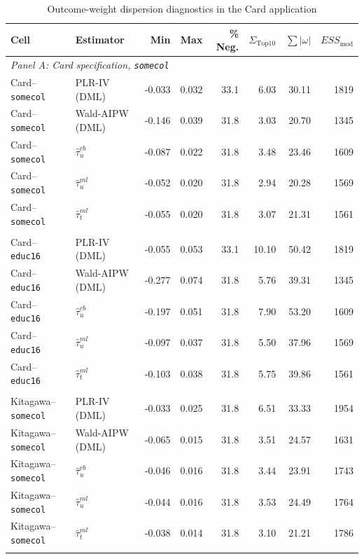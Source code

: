 \documentclass[12pt, a4paper, oneside]{article}
\theoremstyle{plain}
\theoremstyle{definition}
\begin{document}
\begin{table}[htbp]
\centering
\caption{Outcome-weight dispersion diagnostics in the Card application}
\label{tab:card_owd}
\scriptsize
\setlength{\tabcolsep}{3.5pt}
\begin{tabular}{llrrrrrr}
\toprule
Cell & Estimator & Min & Max & \% Neg. & $\Sigma_{\mathrm{Top10}}$ & $\sum|\omega|$ & $ESS_{\mathrm{mod}}$ \\
\midrule
\multicolumn{8}{l}{\textit{Panel A: Card specification, \texttt{somecol}}} \\
Card--\texttt{somecol} & PLR-IV (DML) & -0.033 & 0.032 & 33.1 & 6.03 & 30.11 & 1819 \\
Card--\texttt{somecol} & Wald-AIPW (DML) & -0.146 & 0.039 & 31.8 & 3.03 & 20.70 & 1345 \\
Card--\texttt{somecol} & $\hat{\tau}^{cb}_{u}$ & -0.087 & 0.022 & 31.8 & 3.48 & 23.46 & 1609 \\
Card--\texttt{somecol} & $\hat{\tau}^{ml}_{u}$ & -0.052 & 0.020 & 31.8 & 2.94 & 20.28 & 1569 \\
Card--\texttt{somecol} & $\hat{\tau}^{ml}_{t}$ & -0.055 & 0.020 & 31.8 & 3.07 & 21.31 & 1561 \\
\addlinespace

\multicolumn{8}{l}{\textit{Panel B: Card specification, \texttt{educ16}}} \\
Card--\texttt{educ16} & PLR-IV (DML) & -0.055 & 0.053 & 33.1 & 10.10 & 50.42 & 1819 \\
Card--\texttt{educ16} & Wald-AIPW (DML) & -0.277 & 0.074 & 31.8 & 5.76 & 39.31 & 1345 \\
Card--\texttt{educ16} & $\hat{\tau}^{cb}_{u}$ & -0.197 & 0.051 & 31.8 & 7.90 & 53.20 & 1609 \\
Card--\texttt{educ16} & $\hat{\tau}^{ml}_{u}$ & -0.097 & 0.037 & 31.8 & 5.50 & 37.96 & 1569 \\
Card--\texttt{educ16} & $\hat{\tau}^{ml}_{t}$ & -0.103 & 0.038 & 31.8 & 5.75 & 39.86 & 1561 \\
\addlinespace

\multicolumn{8}{l}{\textit{Panel C: Kitagawa specification, \texttt{somecol}}} \\
Kitagawa--\texttt{somecol} & PLR-IV (DML) & -0.033 & 0.025 & 31.8 & 6.51 & 33.33 & 1954 \\
Kitagawa--\texttt{somecol} & Wald-AIPW (DML) & -0.065 & 0.015 & 31.8 & 3.51 & 24.57 & 1631 \\
Kitagawa--\texttt{somecol} & $\hat{\tau}^{cb}_{u}$ & -0.046 & 0.016 & 31.8 & 3.44 & 23.91 & 1743 \\
Kitagawa--\texttt{somecol} & $\hat{\tau}^{ml}_{u}$ & -0.044 & 0.016 & 31.8 & 3.53 & 24.49 & 1764 \\
Kitagawa--\texttt{somecol} & $\hat{\tau}^{ml}_{t}$ & -0.038 & 0.014 & 31.8 & 3.10 & 21.21 & 1786 \\
\addlinespace


\end{tabular}
\end{table}
\end{document}
